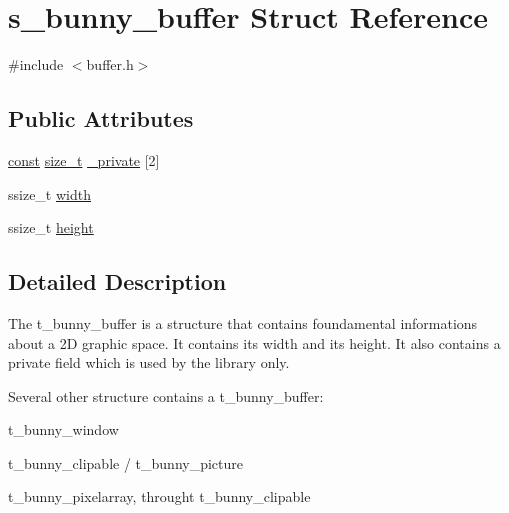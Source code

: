 \hypertarget{structs__bunny__buffer}{\section{s\-\_\-bunny\-\_\-buffer Struct Reference}
\label{structs__bunny__buffer}
}


{\ttfamily \#include $<$buffer.\-h$>$}

\subsection*{Public Attributes}
\begin{DoxyCompactItemize}
\item 
\hyperlink{term__entry_8h_a57bd63ce7f9a353488880e3de6692d5a}{const} \hyperlink{nc__alloc_8h_a7b60c5629e55e8ec87a4547dd4abced4}{size\-\_\-t} \hyperlink{structs__bunny__buffer_a53ac3ca3b001db541dc8e42064fa8277}{\-\_\-private} \mbox{[}2\mbox{]}
\item 
ssize\-\_\-t \hyperlink{structs__bunny__buffer_a9bfe790b1cffeea4e4345d05d9026fc8}{width}
\item 
ssize\-\_\-t \hyperlink{structs__bunny__buffer_aa3b7e2d62d9dba94ed7ab6ccd23a4fdc}{height}
\end{DoxyCompactItemize}


\subsection{Detailed Description}
The t\-\_\-bunny\-\_\-buffer is a structure that contains foundamental informations about a 2\-D graphic space. It contains its width and its height. It also contains a private field which is used by the library only.

Several other structure contains a t\-\_\-bunny\-\_\-buffer\-:
\begin{DoxyItemize}
\item t\-\_\-bunny\-\_\-window
\item t\-\_\-bunny\-\_\-clipable / t\-\_\-bunny\-\_\-picture
\item t\-\_\-bunny\-\_\-pixelarray, throught t\-\_\-bunny\-\_\-clipable 
\end{DoxyItemize}


